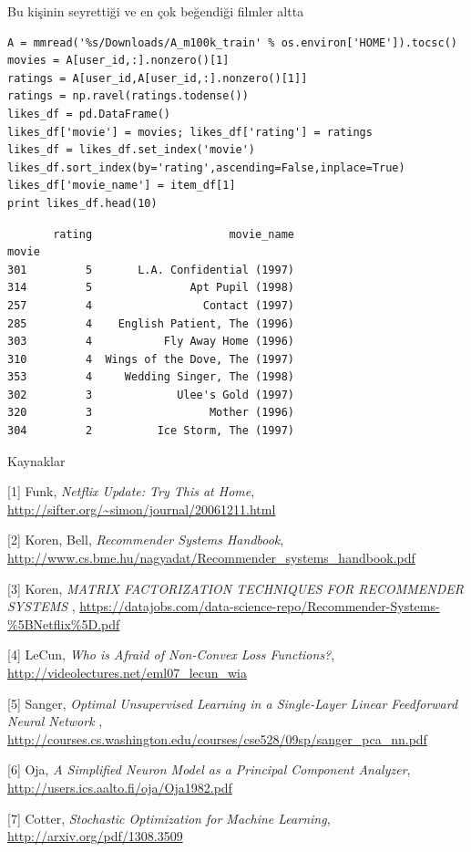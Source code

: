 \documentclass[12pt,fleqn]{article}\usepackage{../../common}
\begin{document}
Bu kişinin seyrettiği ve en çok beğendiği filmler altta

\begin{verbatim}
A = mmread('%s/Downloads/A_m100k_train' % os.environ['HOME']).tocsc()
movies = A[user_id,:].nonzero()[1]
ratings = A[user_id,A[user_id,:].nonzero()[1]]
ratings = np.ravel(ratings.todense())
likes_df = pd.DataFrame()
likes_df['movie'] = movies; likes_df['rating'] = ratings
likes_df = likes_df.set_index('movie')
likes_df.sort_index(by='rating',ascending=False,inplace=True)
likes_df['movie_name'] = item_df[1]
print likes_df.head(10)
\end{verbatim}

\begin{verbatim}
       rating                     movie_name
movie                                       
301         5       L.A. Confidential (1997)
314         5               Apt Pupil (1998)
257         4                 Contact (1997)
285         4    English Patient, The (1996)
303         4           Fly Away Home (1996)
310         4  Wings of the Dove, The (1997)
353         4     Wedding Singer, The (1998)
302         3             Ulee's Gold (1997)
320         3                  Mother (1996)
304         2          Ice Storm, The (1997)
\end{verbatim}

Kaynaklar

[1] Funk, {\em Netflix Update: Try This at Home}, \url{http://sifter.org/~simon/journal/20061211.html}

[2] Koren, Bell, {\em Recommender Systems Handbook}, \url{http://www.cs.bme.hu/nagyadat/Recommender_systems_handbook.pdf}

[3] Koren, {\em MATRIX FACTORIZATION TECHNIQUES FOR RECOMMENDER SYSTEMS }, \url{https://datajobs.com/data-science-repo/Recommender-Systems-%5BNetflix%5D.pdf}

[4] LeCun, {\em Who is Afraid of Non-Convex Loss Functions?}, \url{http://videolectures.net/eml07_lecun_wia}

[5] Sanger, {\em Optimal Unsupervised Learning in a Single-Layer Linear Feedforward Neural Network }, \url{http://courses.cs.washington.edu/courses/cse528/09sp/sanger_pca_nn.pdf} %

[6] Oja, {\em A Simplified Neuron Model as a Principal Component Analyzer}, \url{http://users.ics.aalto.fi/oja/Oja1982.pdf}

[7] Cotter, {\em Stochastic Optimization for Machine Learning}, \url{http://arxiv.org/pdf/1308.3509}
\end{document}
